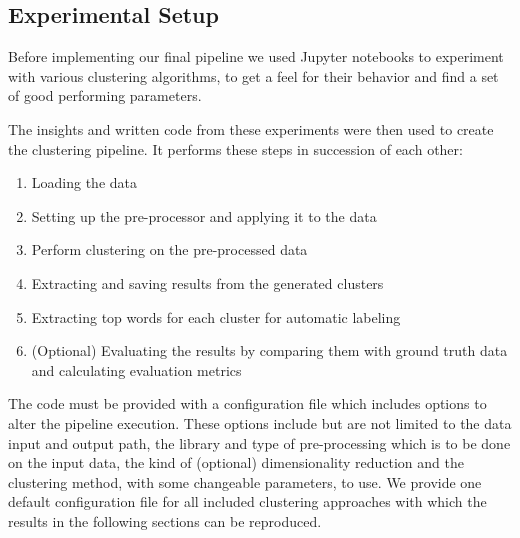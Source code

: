 \subsection{Experimental Setup}
Before implementing our final pipeline we used Jupyter notebooks to experiment with various clustering algorithms, to get a feel for their behavior and find a set of good performing parameters.

The insights and written code from these experiments were then used to create the clustering pipeline. It performs these steps in succession of each other:
\begin{enumerate}
    \item Loading the data
    \item Setting up the pre-processor and applying it to the data
    \item Perform clustering on the pre-processed data
    \item Extracting and saving results from the generated clusters
    \item Extracting top words for each cluster for automatic labeling
    \item (Optional) Evaluating the results by comparing them with ground truth data and calculating evaluation metrics
\end{enumerate}

The code must be provided with a configuration file which includes options to alter the pipeline execution. These options include but are not limited to the data input and output path, the library and type of pre-processing which is to be done on the input data, the kind of (optional) dimensionality reduction and the clustering method, with some changeable parameters, to use.
We provide one default configuration file for all included clustering approaches with which the results in the following sections can be reproduced. 